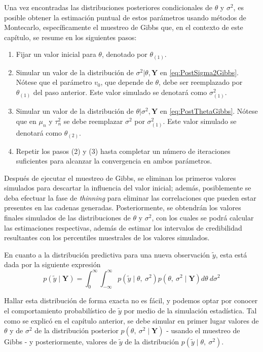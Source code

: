 \documentclass[
  10pt,
  spanish,
]{book}
\providecommand{\tightlist}{%
  \setlength{\itemsep}{0pt}\setlength{\parskip}{0pt}}
\theoremstyle{definition}
\theoremstyle{definition}
\theoremstyle{definition}
\theoremstyle{definition}
\theoremstyle{remark}
\begin{document}
Una vez encontradas las distribuciones posteriores condicionales de \(\theta\) y \(\sigma^2\), es posible obtener la estimación puntual de estos parámetros usando métodos de Montecarlo, específicamente el muestreo de Gibbs que, en el contexto de este capítulo, se resume en los siguientes pasos:

\begin{enumerate}
\def\labelenumi{\arabic{enumi}.}
\tightlist
\item
  Fijar un valor inicial para \(\theta\), denotado por \(\theta_{(1)}\).
\item
  Simular un valor de la distribución de \(\sigma^2|\theta,\mathbf{Y}\) en \eqref{eq:PostSigma2Gibbs}. Nótese que el parámetro \(v_0\), que depende de \(\theta\), debe ser reemplazado por \(\theta_{(1)}\) del paso anterior. Este valor simulado se denotará como \(\sigma^2_{(1)}\).
\item
  Simular un valor de la distribución de \(\theta|\sigma^2,\mathbf{Y}\) en \eqref{eq:PostThetaGibbs}. Nótese que en \(\mu_n\) y \(\tau^2_n\) se debe reemplazar \(\sigma^2\) por \(\sigma^2_{(1)}\). Este valor simulado se denotará como \(\theta_{(2)}\).
\item
  Repetir los pasos (2) y (3) hasta completar un número de iteraciones suficientes para alcanzar la convergencia en ambos parámetros.
\end{enumerate}

Después de ejecutar el muestreo de Gibbs, se eliminan los primeros valores simulados para descartar la influencia del valor inicial; además, posiblemente se deba efectuar la fase de \emph{thinning} para eliminar las correlaciones que pueden estar presentes en las cadenas generadas. Posteriormente, se obtendrán los valores finales simulados de las distribuciones de \(\theta\) y \(\sigma^2\), con los cuales se podrá calcular las estimaciones respectivas, además de estimar los intervalos de credibilidad resultantes con los percentiles muestrales de los valores simulados.

En cuanto a la distribución predictiva para una nueva observación \(\tilde{y}\), esta está dada por la siguiente expresión
\begin{equation*}
p(\tilde{y}\mid\mathbf{Y})=\int_0^\infty\int_{-\infty}^\infty p(\tilde{y}\mid\theta,\ \sigma^2)p(\theta,\ \sigma^2\mid\mathbf{Y})d\theta\ d\sigma^2
\end{equation*}

Hallar esta distribución de forma exacta no es fácil, y podemos optar por conocer el comportamiento probabilístico de \(\tilde{y}\) por medio de la simulación estadística. Tal como se explicó en el capítulo anterior, se debe simular en primer lugar valores de \(\theta\) y de \(\sigma^2\) de la distribución posterior \(p(\theta,\ \sigma^2\mid\mathbf{Y})\) - usando el muestreo de Gibbs - y posteriormente, valores de \(\tilde{y}\) de la distribución \(p(\tilde{y}\mid\theta,\ \sigma^2)\).
\end{document}
